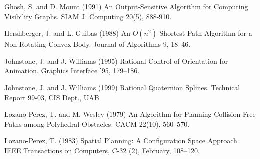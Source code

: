 
\begin{thebibliography}{Johnstone \& Williams 95}

Ghosh, S. and D. Mount (1991)
An Output-Sensitive Algorithm for Computing Visibility Graphs.
SIAM J. Computing 20(5), 888-910.

Hershberger, J. and L. Guibas (1988)
An $O(n^2)$ Shortest Path Algorithm for a Non-Rotating Convex Body.
Journal of Algorithms 9, 18--46.

Johnstone, J. and J. Williams (1995)
Rational Control of Orientation for Animation.
Graphics Interface '95, 179--186.

Johnstone, J. and J. Williams (1999)
Rational Quaternion Splines.
Technical Report 99-03, CIS Dept., UAB.

Lozano-Perez, T. and M. Wesley (1979)
An Algorithm for Planning Collision-Free Paths among Polyhedral Obstacles.
CACM 22(10), 560--570.

Lozano-Perez, T. (1983)
Spatial Planning: A Configuration Space Approach.
IEEE Transactions on Computers, C-32 (2), February, 108--120.

\end{thebibliography}


